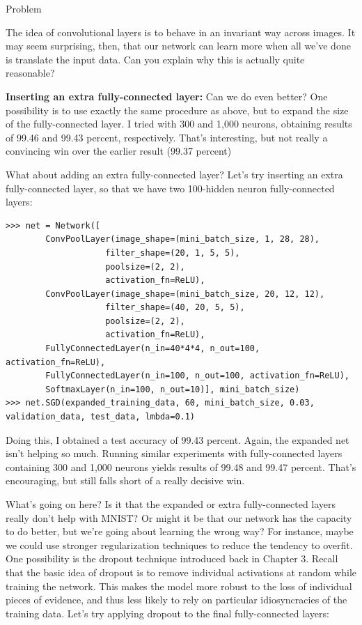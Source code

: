 \documentclass[a4paper,twoside,10pt]{book}
\begin{document}
\begin{exercize}{Problem}
\item The idea of convolutional layers is to behave in an invariant way across images. It may seem surprising, then, that our network can learn more when all we've done is translate the input data. Can you explain why this is actually quite reasonable?
\end{exercize}
\textbf{Inserting an extra fully-connected layer:} Can we do even better? One possibility is to use exactly the same procedure as above, but to expand the size of the fully-connected layer. I tried with 300 and 1,000 neurons, obtaining results of 99.46 and 99.43 percent, respectively. That's interesting, but not really a convincing win over the earlier result (99.37 percent)

What about adding an extra fully-connected layer? Let's try inserting an extra fully-connected layer, so that we have two 100-hidden neuron fully-connected layers:

\begin{lstlisting}
>>> net = Network([
		ConvPoolLayer(image_shape=(mini_batch_size, 1, 28, 28), 
					filter_shape=(20, 1, 5, 5), 
					poolsize=(2, 2), 
					activation_fn=ReLU),
		ConvPoolLayer(image_shape=(mini_batch_size, 20, 12, 12), 
					filter_shape=(40, 20, 5, 5), 
					poolsize=(2, 2), 
					activation_fn=ReLU),
		FullyConnectedLayer(n_in=40*4*4, n_out=100, activation_fn=ReLU),
		FullyConnectedLayer(n_in=100, n_out=100, activation_fn=ReLU),
		SoftmaxLayer(n_in=100, n_out=10)], mini_batch_size)
>>> net.SGD(expanded_training_data, 60, mini_batch_size, 0.03, validation_data, test_data, lmbda=0.1)

\end{lstlisting}
Doing this, I obtained a test accuracy of 99.43 percent. Again, the expanded net isn't helping so much. Running similar experiments with fully-connected layers containing 300 and 1,000 neurons yields results of 99.48 and 99.47 percent. That's encouraging, but still falls short of a really decisive win.


What's going on here? Is it that the expanded or extra fully-connected layers really don't help with MNIST? Or might it be that our network has the capacity to do better, but we're going about learning the wrong way? For instance, maybe we could use stronger regularization techniques to reduce the tendency to overfit. One possibility is the dropout technique introduced back in Chapter 3. Recall that the basic idea of dropout is to remove individual activations at random while training the network. This makes the model more robust to the loss of individual pieces of evidence, and thus less likely to rely on particular idiosyncracies of the training data. Let's try applying dropout to the final fully-connected layers:
\end{document}
